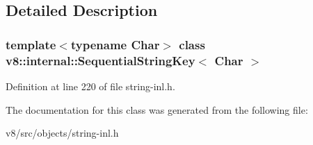 \subsection{Detailed Description}
\subsubsection*{template$<$typename Char$>$\newline
class v8\+::internal\+::\+Sequential\+String\+Key$<$ Char $>$}



Definition at line 220 of file string-\/inl.\+h.



The documentation for this class was generated from the following file\+:\begin{DoxyCompactItemize}
\item 
v8/src/objects/string-\/inl.\+h\end{DoxyCompactItemize}
